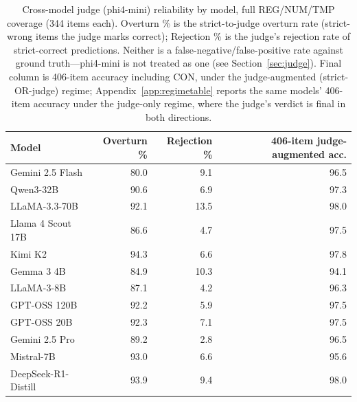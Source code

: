 \begin{table}[h]
\centering\small
\begin{tabular}{lrrr}
\toprule
Model & Overturn \% & Rejection \% & 406-item judge-augmented acc. \\
\midrule
Gemini 2.5 Flash & 80.0 & 9.1 & 96.5 \\
Qwen3-32B & 90.6 & 6.9 & 97.3 \\
LLaMA-3.3-70B & 92.1 & 13.5 & 98.0 \\
Llama 4 Scout 17B & 86.6 & 4.7 & 97.5 \\
Kimi K2 & 94.3 & 6.6 & 97.8 \\
Gemma 3 4B & 84.9 & 10.3 & 94.1 \\
LLaMA-3-8B & 87.1 & 4.2 & 96.3 \\
GPT-OSS 120B & 92.2 & 5.9 & 97.5 \\
GPT-OSS 20B & 92.3 & 7.1 & 97.5 \\
Gemini 2.5 Pro & 89.2 & 2.8 & 96.5 \\
Mistral-7B & 93.0 & 6.6 & 95.6 \\
DeepSeek-R1-Distill & 93.9 & 9.4 & 98.0 \\
\bottomrule
\end{tabular}
\caption{Cross-model judge (phi4-mini) reliability by model, full REG/NUM/TMP coverage (344 items
each). Overturn \% is the strict-to-judge overturn rate (strict-wrong items the judge marks
correct); Rejection \% is the judge's rejection rate of strict-correct predictions. Neither is a
false-negative/false-positive rate against ground truth---phi4-mini is not treated as one (see
Section~\ref{sec:judge}). Final column is 406-item accuracy including CON, under the
judge-augmented (strict-OR-judge) regime; Appendix~\ref{app:regimetable} reports the same models'
406-item accuracy under the judge-only regime, where the judge's verdict is final in both
directions.}
\label{tab:judgereliability}
\end{table}
